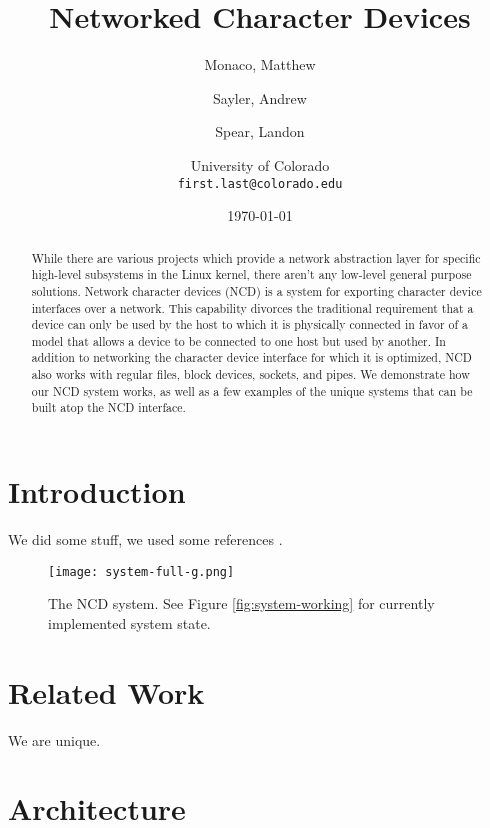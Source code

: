 \documentclass[11pt,twocolumn]{article}
\begin{document}
\title{Networked Character Devices}
\author{Monaco, Matthew \and Sayler, Andrew \and Spear, Landon \\
  \and University of Colorado \\
  \texttt{first.last@colorado.edu}
}
\date{\today}

\maketitle

\begin{abstract}
While there are various projects which provide a network abstraction layer for
specific high-level subsystems in the Linux kernel, there aren't any low-level
general purpose solutions. Network character devices (NCD) is a system for
exporting character device interfaces over a network. This capability
divorces the traditional requirement that a device can only be used by
the host to which it is physically connected in favor of a model that
allows a device to be connected to one host but used by another.
In addition to networking the character device interface for which it
is optimized, NCD also works with regular files, block devices,
sockets, and pipes. We demonstrate how our NCD system works, as well
as a few examples of the unique systems that can be built atop the NCD
interface.
\end{abstract}


\section{Introduction}
\label{sec:introduction}

We did some stuff, we used some references \cite{ldd3}.

\begin{figure}[h]
  \centering
  \texttt{[image: system-full-g.png]}
  \caption{The NCD system. See Figure \ref{fig:system-working}
    for currently implemented system state.}
  \label{fig:system-full}
\end{figure}

\section{Related Work}
\label{sec:relatedwork}

We are unique.


\section{Architecture}
\label{sec:architecture}
\end{document}
